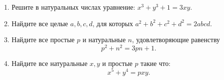 \documentclass{article}
\begin{document}
\begin{enumerate}[label*=\protect\fbox{\arabic{enumi}}]
\item Решите в натуральных числах уравнение:  $x^3 + y^3 + 1 = 3xy$.

\item Найдите все целые $a, b, c, d$, для которых $a^2 +b^2 +c^2 +d^2 = 2abcd$.

\item Найдите все простые $p$ и натуральные $n$, удовлетворяющие равенству $$p^2 +n^2 =3pn+1.$$
	
\item Найдите все натуральные $x, y$ и простые $p$ такие что:
$$x^5 + y^4 = pxy.$$

\end{enumerate}
\end{document}
